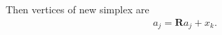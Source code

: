 \documentclass[final,1p,times]{elsarticle}
\begin{document}
Then vertices of new simplex are
\begin{align}
	a_j = \bm{R}a_j + x_k.
	\label{}
\end{align}
\end{document}
